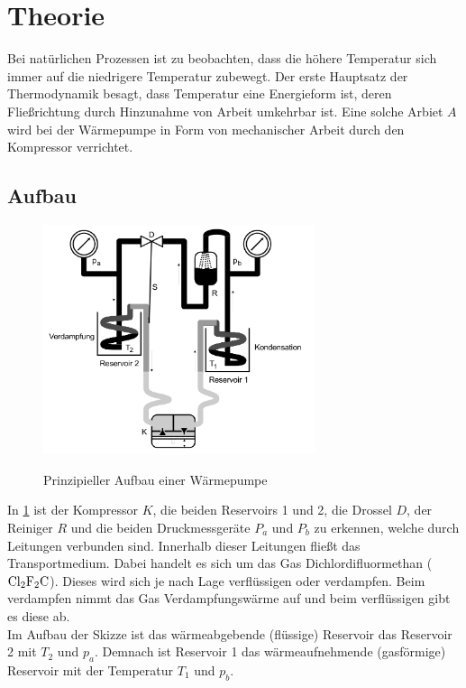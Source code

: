 \section{Theorie}
\label{sec:Theorie}


Bei natürlichen Prozessen ist zu beobachten, dass die höhere Temperatur sich immer auf die niedrigere Temperatur zubewegt.
Der erste Hauptsatz der Thermodynamik besagt, dass Temperatur eine Energieform ist, deren Fließrichtung durch Hinzunahme von Arbeit umkehrbar ist. 
Eine solche Arbiet $A$ wird bei der Wärmepumpe in Form von mechanischer Arbeit durch den Kompressor verrichtet.

\subsection{Aufbau}

\begin{figure} 
    \centering
    \includegraphics[width=8cm] {pictures/Aufbau.png} \cite{v206} 
    \caption{Prinzipieller Aufbau einer Wärmepumpe}
    \label{fig:aufbau_wärmepumpe}
\end{figure} 


In \ref{fig:aufbau_wärmepumpe} ist der Kompressor $K$, die beiden Reservoirs 1 und 2, die Drossel $D$, der Reiniger $R$ und die beiden 
Druckmessgeräte $P_{a}$ und $P_{b}$ zu erkennen, welche durch Leitungen verbunden sind. Innerhalb dieser Leitungen fließt das 
Transportmedium. Dabei handelt es sich um das Gas Dichlordifluormethan ($\ce{Cl2F2C}$). Dieses wird sich je nach Lage verflüssigen oder verdampfen. 
Beim verdampfen nimmt das Gas Verdampfungswärme auf und beim verflüssigen gibt es diese ab. \\

Im Aufbau der Skizze ist das wärmeabgebende (flüssige) Reservoir das Reservoir 2 mit $T_{2}$ und $p_{a}$. Demnach ist Reservoir 1 das wärmeaufnehmende
(gasförmige) Reservoir mit der Temperatur $T_{1}$ und $p_{b}$. \\

